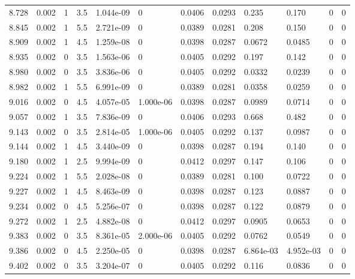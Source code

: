 \documentclass[preview]{standalone}
\begin{document}
{{{{{{\begin{tabular}{L{1.2cm}C{1.2cm} C{0.3cm}C{0.5cm} C{1.4cm}C{1.4cm} C{1.4cm}C{1.4cm} C{1.6cm}C{1.6cm} C{1.6cm}C{1.6cm}}
  8.728  &  0.002  & 1     & 3.5 &  1.044e-09  & 0  &  0.0406&   0.0293& 0.235 & 0.170   &  0 & 0  \\ 
  8.845  &  0.002  & 1     & 5.5 &  2.721e-09  & 0  &  0.0389&   0.0281& 0.208 & 0.150   &  0 & 0  \\ 
  8.909  &  0.002  & 1     & 4.5 &  1.259e-08  & 0  &  0.0398&   0.0287& 0.0672 & 0.0485   &  0 & 0  \\ 
  8.935  &  0.002  & 0     & 3.5 &  1.563e-06  & 0  &  0.0405&   0.0292& 0.197 & 0.142   &  0 & 0  \\ 
  8.980  &  0.002  & 0     & 3.5 &  3.836e-06  & 0  &  0.0405&   0.0292& 0.0332 & 0.0239   &  0 & 0  \\ 
  8.982  &  0.002  & 1     & 5.5 &  6.991e-09  & 0  &  0.0389&   0.0281& 0.0358 & 0.0259   &  0 & 0  \\ 
  9.016  &  0.002  & 0     & 4.5 &  4.057e-05  & 1.000e-06  &  0.0398&   0.0287& 0.0989 & 0.0714   &  0 & 0  \\ 
  9.057  &  0.002  & 1     & 3.5 &  7.836e-09  & 0  &  0.0406&   0.0293& 0.668 & 0.482   &  0 & 0  \\ 
  9.143  &  0.002  & 0     & 3.5 &  2.814e-05  & 1.000e-06  &  0.0405&   0.0292& 0.137 & 0.0987   &  0 & 0  \\ 
  9.144  &  0.002  & 1     & 4.5 &  3.440e-09  & 0  &  0.0398&   0.0287& 0.194 & 0.140   &  0 & 0  \\ 
  9.180  &  0.002  & 1     & 2.5 &  9.994e-09  & 0  &  0.0412&   0.0297& 0.147 & 0.106   &  0 & 0  \\ 
  9.224  &  0.002  & 1     & 5.5 &  2.028e-08  & 0  &  0.0389&   0.0281& 0.100 & 0.0722   &  0 & 0  \\ 
  9.227  &  0.002  & 1     & 4.5 &  8.463e-09  & 0  &  0.0398&   0.0287& 0.123 & 0.0887   &  0 & 0  \\ 
  9.234  &  0.002  & 0     & 4.5 &  5.256e-07  & 0  &  0.0398&   0.0287& 0.122 & 0.0879   &  0 & 0  \\ 
  9.272  &  0.002  & 1     & 2.5 &  4.882e-08  & 0  &  0.0412&   0.0297& 0.0905 & 0.0653   &  0 & 0  \\ 
  9.383  &  0.002  & 0     & 3.5 &  8.361e-05  & 2.000e-06  &  0.0405&   0.0292& 0.0762 & 0.0549   &  0 & 0  \\ 
  9.386  &  0.002  & 0     & 4.5 &  2.250e-05  & 0  &  0.0398&   0.0287& 6.864e-03 & 4.952e-03   &  0 & 0  \\ 
  9.402  &  0.002  & 0     & 3.5 &  3.204e-07  & 0  &  0.0405&   0.0292& 0.116 & 0.0836   &  0 & 0  \\ 

\end{tabular}}}}}}}
\end{document}
